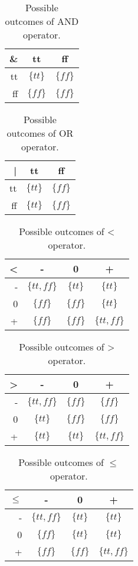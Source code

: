 \begin{table}
\begin{tabular}{| r | c | c |}
\hline
 \&   & tt   & ff  \\
\hline
 tt  & $\{tt\}$ & $\{ff\}$  \\
\hline
 ff  & $\{ff\}$ & $\{ff\}$ \\
\hline
\end{tabular}
\centering
\caption{Possible outcomes of AND operator.}
\label{table:and_operator}
\end{table}

\begin{table}
\begin{tabular}{| r | c | c |}
\hline
 |   & tt   & ff  \\
\hline
 tt  & $\{tt\}$ & $\{ff\}$  \\
\hline
 ff  & $\{tt\}$ & $\{ff\}$ \\
\hline
\end{tabular}
\centering
\caption{Possible outcomes of OR operator.}
\label{table:or_operator}
\end{table}

\begin{table}
\begin{tabular}{| r | c | c | c |}
\hline
 <   & -   & 0 & +  \\
\hline
 -  & $\{tt,ff\}$ & $\{tt\}$ & $\{tt\}$  \\
\hline
 0  & $\{ff\}$ & $\{ff\}$ & $\{tt\}$ \\
\hline
 +  & $\{ff\}$ & $\{ff\}$ & $\{tt,ff\}$ \\
 \hline
\end{tabular}
\centering
\caption{Possible outcomes of < operator.}
\label{table:less_than_operator}
\end{table}

\begin{table}
\begin{tabular}{| r | c | c | c |}
\hline
 >   & -   & 0 & +  \\
\hline
 -  & $\{tt,ff\}$ & $\{ff\}$ & $\{ff\}$  \\
\hline
 0  & $\{tt\}$ & $\{ff\}$ & $\{ff\}$ \\
\hline
 +  & $\{tt\}$ & $\{tt\}$ & $\{tt,ff\}$ \\
 \hline
\end{tabular}
\centering
\caption{Possible outcomes of > operator.}
\label{table:greater_than_operator}
\end{table}

\begin{table}
\begin{tabular}{| r | c | c | c |}
\hline
 $\leq$   & -   & 0 & +  \\
\hline
 -  & $\{tt,ff\}$ & $\{tt\}$ & $\{tt\}$  \\
\hline
 0  & $\{ff\}$ & $\{tt\}$ & $\{tt\}$ \\
\hline
 +  & $\{ff\}$ & $\{ff\}$ & $\{tt,ff\}$ \\
 \hline
\end{tabular}
\centering
\caption{Possible outcomes of $\leq$ operator.}
\label{table:less_than_equal_operator}
\end{table}

